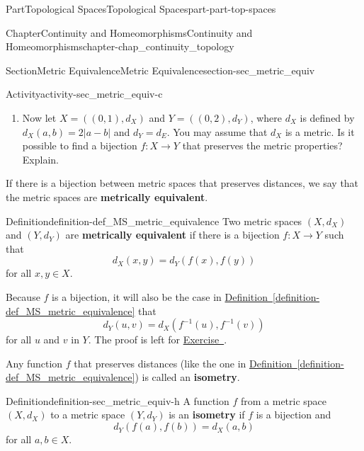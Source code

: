 \documentclass[oneside,10pt,]{book}
\newcommand{\xreffont}{\relax}
\newcommand{\terminology}[1]{\textbf{#1}}
\numberwithin{equation}{chapter}
\begin{document}
\begin{partptx}{Part}{Topological Spaces}{}{Topological Spaces}{}{}{part-part-top-spaces}
\begin{chapterptx}{Chapter}{Continuity and Homeomorphisms}{}{Continuity and Homeomorphisms}{}{}{chapter-chap_continuity_topology}
\begin{sectionptx}{Section}{Metric Equivalence}{}{Metric Equivalence}{}{}{section-sec_metric_equiv}
\begin{activity}{Activity}{}{activity-sec_metric_equiv-c}
\begin{enumerate}[font=\bfseries,label=(\alph*),ref=\alph*]
\item{}Now let \(X = ((0,1), d_X)\) and \(Y = ((0,2), d_Y)\), where \(d_X\) is defined by \(d_X(a,b) = 2 | a-b |\) and \(d_Y = d_E\). You may assume that \(d_X\) is a metric. Is it possible to find a bijection \(f : X \to Y\) that preserves the metric properties? Explain.%
\end{enumerate}%
\end{activity}%
If there is a bijection between metric spaces that preserves distances, we say that the metric spaces are \terminology{metrically equivalent}.%
\begin{definition}{Definition}{}{definition-def_MS_metric_equivalence}%
%
Two metric spaces \((X,d_X)\) and \((Y,d_Y)\) are \terminology{metrically equivalent} if there is a bijection \(f : X \to Y\) such that%
\begin{equation*}
d_X(x,y) = d_Y(f(x),f(y))
\end{equation*}
for all \(x,y \in X\).%
\end{definition}
Because \(f\) is a bijection, it will also be the case in \hyperref[definition-def_MS_metric_equivalence]{Definition~{\xreffont\ref{definition-def_MS_metric_equivalence}}} that%
\begin{equation*}
d_Y(u,v) = d_X(f^{-1}(u), f^{-1}(v))
\end{equation*}
for all \(u\) and \(v\) in \(Y\). The proof is left for \hyperlink{exercise-ex_isometry_reverse}{Exercise~{\xreffont 1}}.%
\par
Any function \(f\) that preserves distances (like the one in \hyperref[definition-def_MS_metric_equivalence]{Definition~{\xreffont\ref{definition-def_MS_metric_equivalence}}}) is called an \terminology{isometry}.%
\begin{definition}{Definition}{}{definition-sec_metric_equiv-h}%
%
A function \(f\) from a metric space \((X,d_X)\) to a metric space \((Y, d_Y)\) is an \terminology{isometry} if \(f\) is a bijection and%
\begin{equation}
d_Y(f(a),f(b)) = d_X(a,b)\label{men-eq_distance_preserving}
\end{equation}
for all \(a, b \in X\).%
\end{definition}

\end{sectionptx}
\end{chapterptx}
\end{partptx}
\end{document}
